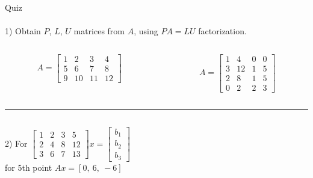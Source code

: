 \documentclass[aspectratio=169]{beamer}
\begin{document}
\begin{frame}[t]{Quiz}
    \framesubtitle{}
    \vspace{-0.3cm}
    1) Obtain $P$, $L$, $U$ matrices from $A$, using $PA=LU$ factorization.
    \begin{columns}[c,onlytextwidth]
        \begin{column}{0.49\textwidth}
            \begin{equation}
                A = \begin{bmatrix}
                    1 & 2  & 3  & 4  \\
                    5 & 6  & 7  & 8  \\
                    9 & 10 & 11 & 12
                \end{bmatrix}
            \end{equation}
        \end{column}
        \begin{column}{0.49\textwidth}
            \begin{equation}
                A = \begin{bmatrix}
                    1 & 4  & 0 & 0 \\
                    3 & 12 & 1 & 5 \\
                    2 & 8  & 1 & 5 \\
                    0 & 2  & 2 & 3
                \end{bmatrix}
            \end{equation}
        \end{column}
    \end{columns}
    \textcolor[RGB]{200,200,200}{\noindent\rule{\linewidth}{0.2pt}}
     \vspace{-0.8cm}
\begin{columns}[T,onlytextwidth]
    \begin{column}{0.3\textwidth}
        2) For $\begin{bmatrix}
            1 & 2 & 3 & 5  \\
            2 & 4 & 8 & 12 \\
            3 & 6 & 7 & 13
        \end{bmatrix} x = \begin{bmatrix}b_1\\b_2\\b_3\end{bmatrix}$ \\
        for 5th point $Ax=[0,\ 6,\ -6]$
    \end{column}

\end{columns}
\end{frame}
\end{document}
